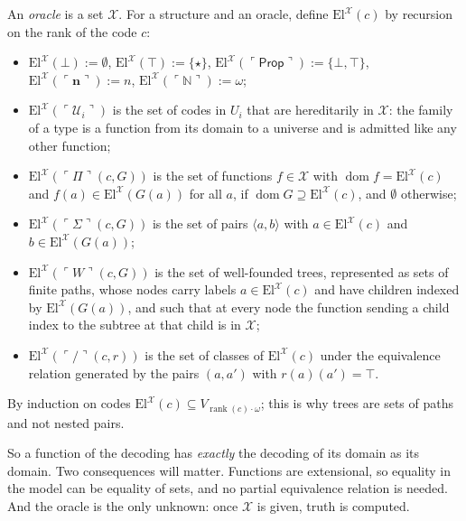 \documentclass[10pt]{article}
\newcommand{\N}{\mathbb{N}}
\newcommand{\Prop}{\mathsf{Prop}}
\newcommand{\rk}{\operatorname{rank}}
\newcommand{\dom}{\operatorname{dom}}
\newcommand{\El}{\mathrm{El}}
\newcommand{\code}[1]{\ulcorner #1\urcorner}
\newcommand{\U}{\mathcal{U}}
\newcommand{\X}{\mathcal{X}}
\begin{document}
\begin{definition}\label{def:El}
An \emph{oracle} is a set $\X$. For a structure and an oracle, define
$\El^\X(c)$ by recursion on the rank of the code $c$:
\begin{itemize}
\item $\El^\X(\bot):=\emptyset$, $\El^\X(\top):=\{\star\}$,
  $\El^\X(\code\Prop):=\{\bot,\top\}$, $\El^\X(\code{\mathbf n}):=n$,
  $\El^\X(\code\N):=\omega$;
\item $\El^\X(\code{\U_i})$ is the set of codes in $U_i$ that are
  hereditarily in $\X$: the family of a type is a function from its
  domain to a universe and is admitted like any other function;
\item $\El^\X(\code\Pi(c,G))$ is the set of functions $f\in\X$ with
  $\dom f=\El^\X(c)$ and $f(a)\in\El^\X(G(a))$ for all $a$, if
  $\dom G\supseteq\El^\X(c)$, and $\emptyset$ otherwise;
\item $\El^\X(\code\Sigma(c,G))$ is the set of pairs $\langle a,b\rangle$
  with $a\in\El^\X(c)$ and $b\in\El^\X(G(a))$;
\item $\El^\X(\code W(c,G))$ is the set of well-founded trees, represented
  as sets of finite paths, whose nodes carry labels $a\in\El^\X(c)$ and
  have children indexed by $\El^\X(G(a))$, and such that at every node the
  function sending a child index to the subtree at that child is in $\X$;
\item $\El^\X(\code/(c,r))$ is the set of classes of $\El^\X(c)$ under the
  equivalence relation generated by the pairs $(a,a')$ with
  $r(a)(a')=\top$.
\end{itemize}
By induction on codes $\El^\X(c)\subseteq V_{\rk(c)\cdot\omega}$; this is
why trees are sets of paths and not nested pairs.
\end{definition}

So a function of the decoding has \emph{exactly} the decoding of its
domain as its domain. Two consequences will matter. Functions are
extensional, so equality in the model can be equality of sets, and no
partial equivalence relation is needed. And the oracle is the only
unknown: once $\X$ is given, truth is computed.
\end{document}
